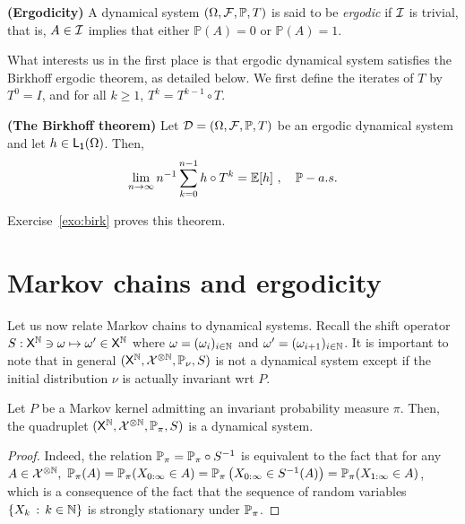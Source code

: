 \documentclass[english,graybox,envcountchap,envcountsame,sectrefs,shortlabels]{svmono}
\theoremstyle{style}
\begin{document}
\begin{definition}
\textbf{(Ergodicity)}  A dynamical system $(\Omega,\mathcal{F},\mathbb{P},T)$
is said to be \emph{ergodic} if $\mathcal{I}$ is trivial, that is, $A\in\mathcal{I}$
implies that either $\mathbb{P}(A)=0$ or $\mathbb{P}(A)=1$.
\end{definition}


What interests us in the first place is that ergodic dynamical system
satisfies the Birkhoff ergodic theorem, as detailed below. We first
define the iterates of $T$ by $T^{0}=I$, and for all $k\geq1$,
$T^{k}=T^{k-1}\circ T$.


\begin{theorem}
\textbf{\label{thm:birk:dynam}(The Birkhoff theorem)} Let $\mathcal{D}=(\Omega,\mathcal{F},\mathbb{P},T)$
be an ergodic dynamical system and let $h\in\mathsf{L_{1}}(\Omega)$.
Then,
\[
\lim_{n\to\infty}n^{-1}\sum_{k=0}^{n-1}h\circ T^{k}=\mathbb{E}[h]\ ,\quad\mathbb{P}-a.s.
\]
\end{theorem}


Exercise~\ref{exo:birk} proves this theorem.



\section{Markov chains and ergodicity}

Let us now relate Markov chains to dynamical systems. Recall the shift
operator $S:\mathsf{X}^{\mathbb{N}}\ni\omega\mapsto\omega'\in\mathsf{X}^{\mathbb{N}}$
where $\omega=(\omega_{i})_{i\in\mathbb{N}}$ and $\omega'=(\omega_{i+1})_{i\in\mathbb{N}}$.
It is important to note that in general $(\mathsf{X}^{\mathbb{N}},\mathcal{X}^{\otimes\mathbb{N}},\mathbb{P}_{\nu},S)$
is not a dynamical system except if the initial distribution $\nu$
is actually invariant wrt $P$.


\begin{lemma}
Let $P$ be a Markov kernel admitting an invariant probability measure
$\pi$. Then, the quadruplet $(\mathsf{X}^{\mathbb{N}},\mathcal{X}^{\otimes\mathbb{N}},\mathbb{P}_{\pi},S)$
is a dynamical system.
\end{lemma}

\begin{proof}
Indeed, the relation $\mathbb{P}_{\pi}=\mathbb{P}_{\pi}\circ S^{-1}$ is equivalent
to the fact that for any $A\in\mathcal{X}^{\otimes\mathbb{N}},$ $\mathbb{P}_{\pi}(A)=\mathbb{P}_{\pi}(X_{0:\infty}\in A)=\mathbb{P}_{\pi}\left(X_{0:\infty}\in S^{-1}(A)\right)=\mathbb{P}_{\pi}(X_{1:\infty}\in A)$,
which is a consequence of the fact that the sequence of random variables
$\left\{ X_{k}\,:\,k\in\mathbb{N}\right\}$ is strongly stationary under $\mathbb{P}_{\pi}$.
\end{proof}
\end{document}

